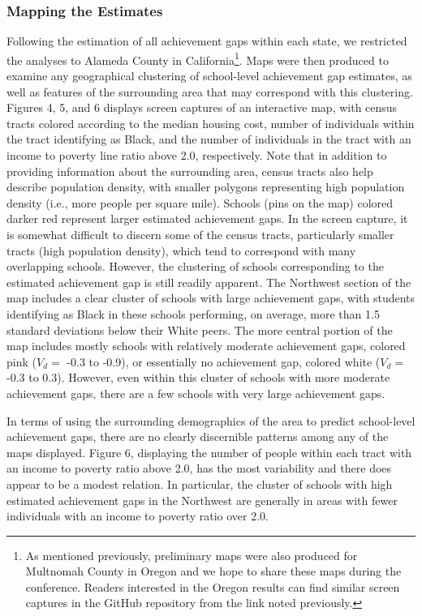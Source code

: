 \documentclass[man, fleqn, noextraspace]{apa6}
\theoremstyle{definition}
\theoremstyle{definition}
\theoremstyle{definition}
\theoremstyle{remark}
\begin{document}
\hypertarget{mapping-the-estimates}{%
\subsubsection{Mapping the Estimates}\label{mapping-the-estimates}}

Following the estimation of all achievement gaps within each state, we
restricted the analyses to Alameda County in California\footnote{As
  mentioned previously, preliminary maps were also produced for
  Multnomah County in Oregon and we hope to share these maps during the
  conference. Readers interested in the Oregon results can find similar
  screen captures in the GitHub repository from the link noted
  previously.}. Maps were then produced to examine any geographical
clustering of school-level achievement gap estimates, as well as
features of the surrounding area that may correspond with this
clustering. Figures 4, 5, and 6 displays screen captures of an
interactive map, with census tracts colored according to the median
housing cost, number of individuals within the tract identifying as
Black, and the number of individuals in the tract with an income to
poverty line ratio above 2.0, respectively. Note that in addition to
providing information about the surrounding area, census tracts also
help describe population density, with smaller polygons representing
high population density (i.e., more people per square mile). Schools
(pins on the map) colored darker red represent larger estimated
achievement gaps. In the screen capture, it is somewhat difficult to
discern some of the census tracts, particularly smaller tracts (high
population density), which tend to correspond with many overlapping
schools. However, the clustering of schools corresponding to the
estimated achievement gap is still readily apparent. The Northwest
section of the map includes a clear cluster of schools with large
achievement gaps, with students identifying as Black in these schools
performing, on average, more than 1.5 standard deviations below their
White peers. The more central portion of the map includes mostly schools
with relatively moderate achievement gaps, colored pink (\(V_d =\) -0.3
to -0.9), or essentially no achievement gap, colored white (\(V_d =\)
-0.3 to 0.3). However, even within this cluster of schools with more
moderate achievement gaps, there are a few schools with very large
achievement gaps.

In terms of using the surrounding demographics of the area to predict
school-level achievement gaps, there are no clearly discernible patterns
among any of the maps displayed. Figure 6, displaying the number of
people within each tract with an income to poverty ratio above 2.0, has
the most variability and there does appear to be a modest relation. In
particular, the cluster of schools with high estimated achievement gaps
in the Northwest are generally in areas with fewer individuals with an
income to poverty ratio over 2.0.
\end{document}
